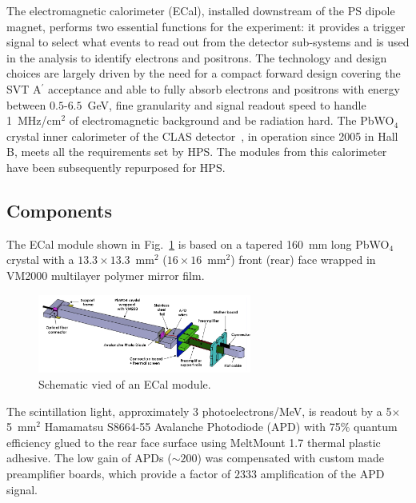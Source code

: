 \documentclass[final,3p,times,twocolumn]{elsarticle}
\newcommand{\Aprime}{A\ensuremath{^\prime}}
\begin{document}
The electromagnetic calorimeter (ECal), installed downstream of the PS dipole magnet, performs two 
essential functions for the experiment: it provides a trigger signal to select what events to read out from 
the detector sub-systems and is used in the analysis to identify electrons and positrons. 
The technology and design choices are largely driven by the need for a compact forward design 
covering the SVT \Aprime{} acceptance and able to fully absorb 
electrons and positrons with energy between $0.5$-$6.5$~GeV, fine granularity and signal 
readout speed to handle 1~MHz/cm$^{2}$ of electromagnetic background and be radiation hard. 
The PbWO$_{4}$ crystal inner 
calorimeter of the CLAS detector~\cite{2008erhm.conf..421N}, in operation since 2005 in Hall B, meets 
all the requirements set by HPS. The modules from this calorimeter have been subsequently 
repurposed for HPS. 


\subsection{Components}

The ECal module shown in Fig.~\ref{fig:ecal-module} is based on a tapered 160~mm long 
PbWO$_{4}$ crystal with a $13.3\times13.3$~mm$^2$ ($16\times16$~mm$^2$) front 
(rear) face wrapped in VM2000 multilayer polymer mirror film. 
\begin{figure}[]
\begin{center}
{\small
\includegraphics[width=7cm]{figures/ecal-module-schematic.png}
\caption{Schematic vied of an ECal module.}
\label{fig:ecal-module}
}
\end{center}
\end{figure}
The scintillation light, approximately $3$ photoelectrons/MeV, is readout by a 
5$\times$5~mm$^2$ Hamamatsu S8664-55 Avalanche Photodiode (APD) with 75\% quantum 
efficiency glued to the rear face surface using MeltMount 1.7 thermal plastic adhesive. 
The low gain of APDs ($\sim 200$) was compensated with custom made preamplifier boards, which 
provide a factor of $2333$ amplification of the APD signal.
\end{document}
